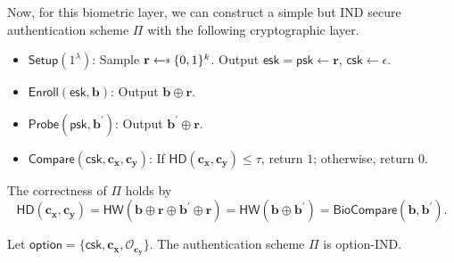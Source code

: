 Now, for this biometric layer, we can construct a simple but IND secure authentication scheme $\Pi$ with the following cryptographic layer.

\begin{itemize}

	\item $\textsf{Setup} (1^\lambda)$: Sample $\mathbf{r} \getsdollar \{0, 1\}^k$. Output $\textsf{esk} = \textsf{psk} \gets \mathbf{r}$, $\textsf{csk} \gets \epsilon$.

	\item $\textsf{Enroll}(\textsf{esk}, \mathbf{b})$: Output $\mathbf{b} \oplus \mathbf{r}$.
	
	\item $\textsf{Probe}(\textsf{psk}, \mathbf{b}^\prime)$: Output $\mathbf{b}^\prime \oplus \mathbf{r}$.

	\item $\textsf{Compare} (\textsf{csk}, \mathbf{c_x}, \mathbf{c_y})$: If $\textsf{HD}(\mathbf{c_x}, \mathbf{c_y}) \leq \tau$, return $1$; otherwise, return $0$. 

\end{itemize}
The correctness of $\Pi$ holds by
\[
	\textsf{HD}(\mathbf{c_x}, \mathbf{c_y}) = \textsf{HW}(\mathbf{b} \oplus \mathbf{r} \oplus \mathbf{b}^\prime \oplus \mathbf{r}) = \textsf{HW}(\mathbf{b} \oplus \mathbf{b}^\prime) = \textsf{BioCompare}(\mathbf{b}, \mathbf{b}^\prime).
\]

\begin{theorem}
\label{thm:rh:ind:particular-biometri-layer}
Let $\textsf{option} = \{\textsf{csk}, \mathbf{c_x}, \mathcal{O}_{\mathbf{c_y}}\}$. The authentication scheme $\Pi$ is \textsf{option}-IND.

\end{theorem}

